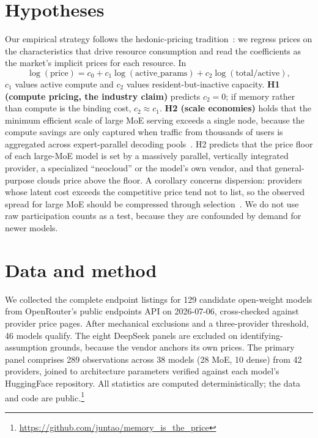 \documentclass[12pt]{article}
\begin{document}
\section{Hypotheses}

Our empirical strategy follows the hedonic-pricing tradition~\cite{rosen}: we
regress prices on the characteristics that drive resource consumption and
read the coefficients as the market's implicit prices for each resource. In
\begin{equation}
\log(\text{price}) = c_0 + c_1 \log(\text{active\_params})
                        + c_2 \log(\text{total}/\text{active}),
\label{eq:hedonic}
\end{equation}
$c_1$ values active compute and $c_2$ values resident-but-inactive capacity.
\textbf{H1 (compute pricing, the industry claim)} predicts $c_2 = 0$; if
memory rather than compute is the binding cost, $c_2 \approx c_1$.
\textbf{H2 (scale economies)} holds that the minimum efficient scale of large
MoE serving exceeds a single node, because the compute savings are only
captured when traffic from thousands of users is aggregated across
expert-parallel decoding pools~\cite{deepseek,lmsys}. H2 predicts that the
price floor of each large-MoE model is set by a massively parallel,
vertically integrated provider, a specialized ``neocloud'' or the model's
own vendor, and that general-purpose clouds price above the floor. A
corollary concerns dispersion: providers whose latent cost exceeds the
competitive price tend not to list, so the observed spread for large MoE
should be compressed through selection~\cite{heckman}. We do not use raw
participation counts as a test, because they are confounded by demand for
newer models.

\section{Data and method}

We collected the complete endpoint listings for 129 candidate open-weight
models from OpenRouter's public endpoints API on 2026-07-06, cross-checked
against provider price pages. After mechanical exclusions and a
three-provider threshold, 46 models qualify. The eight DeepSeek panels are
excluded on identifying-assumption grounds, because the vendor anchors its
own prices. The primary panel comprises 289 observations across 38 models
(28 MoE, 10 dense) from 42 providers, joined to architecture parameters
verified against each model's HuggingFace repository. All statistics are computed deterministically; the data
and code are public.\footnote{\url{https://github.com/juntao/memory_is_the_price}}
\end{document}
